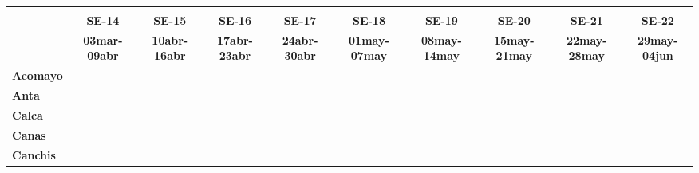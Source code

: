 \begin{tabular}{lccccccccc}
	\textbf{}              	  & \multicolumn{1}{l}{}                        & \multicolumn{1}{l}{}      & \multicolumn{1}{l}{}                         & \multicolumn{1}{l}{}                         & \multicolumn{1}{l}{}                         & \multicolumn{1}{l}{}                        & \multicolumn{1}{l}{}                         & \multicolumn{1}{l}{}                         & \multicolumn{1}{l}{}     \\
	\textbf{}                                                                          	
	&\textbf{SE-14}
	&\textbf{SE-15}								&\textbf{SE-16}	
	&\textbf{SE-17}								&\textbf{SE-18}
	&\textbf{SE-19}								&\textbf{SE-20}	
	&\textbf{SE-21}								&\textbf{SE-22}\\
	\textbf{}              	  	
	&\textbf{03mar-09abr}						&\textbf{10abr-16abr}
	&\textbf{17abr-23abr}						&\textbf{24abr-30abr}
	&\textbf{01may-07may}						&\textbf{08may-14may}
	&\textbf{15may-21may}						&\textbf{22may-28may}
	&\textbf{29may-04jun}\\
	\textbf{Acomayo}                        		
	&\cellcolor[HTML]{FCC46C}					&\cellcolor[HTML]{FCC46C}
	&\cellcolor[HTML]{FCC46C}					&\cellcolor[HTML]{FCC46C}
	&\cellcolor[HTML]{FCC46C}					&\cellcolor[HTML]{FCC46C}
	&\cellcolor[HTML]{FCC46C}					&\cellcolor[HTML]{FCC46C}
	&\cellcolor[HTML]{FCC46C} \\
	\textbf{Anta}                                                   		
	&\cellcolor[HTML]{FCC46C}					&\cellcolor[HTML]{FCC46C}
	&\cellcolor[HTML]{FCC46C}					&\cellcolor[HTML]{FCC46C}
	&\cellcolor[HTML]{FCC46C} 					&\cellcolor[HTML]{FCC46C}
	&\cellcolor[HTML]{FCC46C}					&\cellcolor[HTML]{FCC46C}
	&\cellcolor[HTML]{FCC46C}\\
	\textbf{Calca}      				       								            
	&\cellcolor[HTML]{FCC46C}		   			&\cellcolor[HTML]{FCC46C}		     		&\cellcolor[HTML]{FCC46C}					&\cellcolor[HTML]{FCC46C}			        &\cellcolor[HTML]{FCC46C}   				&\cellcolor[HTML]{FCC46C}					&\cellcolor[HTML]{FCC46C}					&\cellcolor[HTML]{FCC46C}	&\cellcolor[HTML]{FCC46C}\\             			
	\textbf{Canas}                              											
	&\cellcolor[HTML]{FCC46C}
	&\cellcolor[HTML]{FCC46C}					&\cellcolor[HTML]{FCC46C}
	&\cellcolor[HTML]{FCC46C} 					&\cellcolor[HTML]{FCC46C}
	&\cellcolor[HTML]{FCC46C}					&\cellcolor[HTML]{FCC46C}
	&\cellcolor[HTML]{FCC46C}					&\cellcolor[HTML]{FCC46C}\\
	\textbf{Canchis}                             											

\end{tabular}
